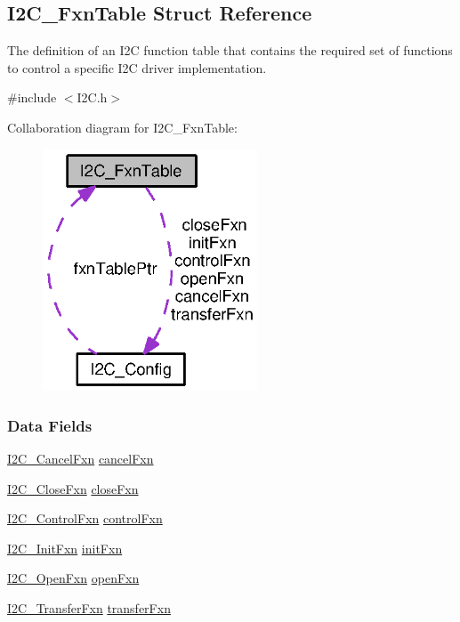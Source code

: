 \subsection{I2\+C\+\_\+\+Fxn\+Table Struct Reference}
\label{struct_i2_c___fxn_table}


The definition of an I2\+C function table that contains the required set of functions to control a specific I2\+C driver implementation.  




{\ttfamily \#include $<$I2\+C.\+h$>$}



Collaboration diagram for I2\+C\+\_\+\+Fxn\+Table\+:
\nopagebreak
\begin{figure}[H]
\begin{center}
\leavevmode
\includegraphics[width=181pt]{struct_i2_c___fxn_table__coll__graph}
\end{center}
\end{figure}
\subsubsection*{Data Fields}
\begin{DoxyCompactItemize}
\item 
\hyperlink{_i2_c_8h_a7a829a2a0fd594c50e93c3e55c7d04aa}{I2\+C\+\_\+\+Cancel\+Fxn} \hyperlink{struct_i2_c___fxn_table_a9fdc075682ec4ae2e2f856b5c758748a}{cancel\+Fxn}
\item 
\hyperlink{_i2_c_8h_a083200108e980a0ef61e458f0b9fb9e7}{I2\+C\+\_\+\+Close\+Fxn} \hyperlink{struct_i2_c___fxn_table_a02f4e6a7daeb64d6741372a5636eedb5}{close\+Fxn}
\item 
\hyperlink{_i2_c_8h_a4b15853f98d3d5e5135b8c52b8465fff}{I2\+C\+\_\+\+Control\+Fxn} \hyperlink{struct_i2_c___fxn_table_af23db6bdc9b619633fb70ddff44412ea}{control\+Fxn}
\item 
\hyperlink{_i2_c_8h_adfb2451c8a1ce70402e43e4743c5fedf}{I2\+C\+\_\+\+Init\+Fxn} \hyperlink{struct_i2_c___fxn_table_ae27540a7175c9ad14b590ddc92e06390}{init\+Fxn}
\item 
\hyperlink{_i2_c_8h_add24fcdaaf1bdef1521ce2489bf1d80e}{I2\+C\+\_\+\+Open\+Fxn} \hyperlink{struct_i2_c___fxn_table_afb8c5f67ba6d0941f6265707083b16f8}{open\+Fxn}
\item 
\hyperlink{_i2_c_8h_aa785484e689c79262f98208689fecd38}{I2\+C\+\_\+\+Transfer\+Fxn} \hyperlink{struct_i2_c___fxn_table_a16048b22814e3d123f82a7674599b15c}{transfer\+Fxn}
\end{DoxyCompactItemize}


